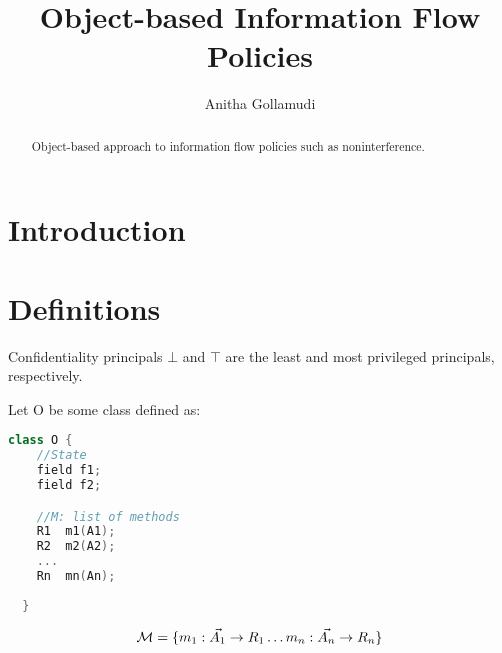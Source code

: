 \documentclass[acmsmall,screen,review, nonacm]{acmart}
\begin{document}
\title{Object-based Information Flow Policies}

\author{Anitha Gollamudi}
\begin{abstract}
 Object-based approach to information flow policies such as noninterference.
\end{abstract}


\maketitle

\section{Introduction}


\section{Definitions}

\begin{definition}[Principals]
Confidentiality principals  $\bot$ and $\top$ are  the least and most privileged principals, respectively.
\end{definition}

Let O be some class defined as:
\begin{lstlisting}[language=C++, commentstyle=\color{codegreen}, keywordstyle=\color{magenta}]
  class O {
    //State
    field f1;  
    field f2;  

    //M: list of methods
    R1  m1(A1); 
    R2  m2(A2);
    ...
    Rn  mn(An);
    
  }
\end{lstlisting}

\begin{definition}
\[
\mathcal{M}  = \{ m_1: \vec{A_1} \to R_1 \dots  m_n: \vec{A_n} \to R_n \}
\]
\end{definition}
\end{document}
